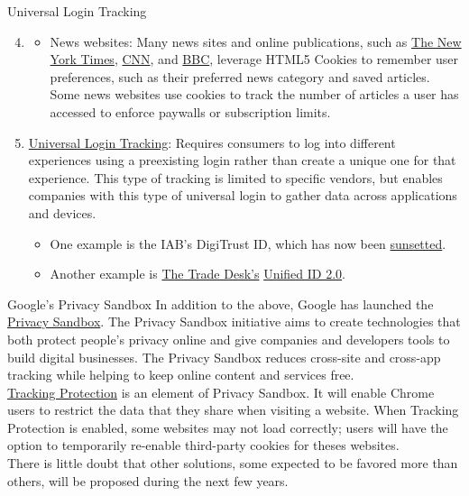 \documentclass[pdf]{beamer}
\theoremstyle{remark}
\theoremstyle{definition}
\begin{document}
\begin{frame}[t]{Universal Login Tracking}
\small
\begin{enumerate}
    \setcounter{enumi}{3}
\item []
\begin{itemize}
  \item News websites: Many news sites and online publications, such as \href{https://www.nytimes.com/}{The New York Times}, \href{https://www.cnn.com/}{CNN}, and \href{https://www.bbc.com/news}{BBC}, leverage HTML5 Cookies to remember user preferences, such as their preferred news category and saved articles. Some news websites use cookies to track the number of articles a user has accessed to enforce paywalls or subscription limits.
\end{itemize}
\item \underline{Universal Login Tracking}: Requires consumers to log into different experiences using a preexisting login rather than create a unique one for that experience. This type of tracking is limited to specific vendors, but enables companies with this type of universal login to gather data across applications and devices. \\
\vspace{1.5ex}
\begin{itemize}
  \item One example is the IAB's DigiTrust ID, which has now been \href{https://iabtechlab.com/blog/digitrust-the-final-chapter/}{sunsetted}. 
  \item Another example is \href{https://www.thetradedesk.com/us/about-us/industry-initiatives/unified-id-solution-2-0}{The Trade Desk's} \href{https://unifiedid.com/}{Unified ID 2.0}. 
\end{itemize}
\end{enumerate}
\end{frame}

\begin{frame}[t]{Google's Privacy Sandbox}
In addition to the above, Google has launched the \href{https://privacysandbox.com/}{Privacy Sandbox}.  The Privacy Sandbox initiative aims to create technologies that both protect people's privacy online and give companies and developers tools to build digital businesses. The Privacy Sandbox reduces cross-site and cross-app tracking while helping to keep online content and services free. \\
\vspace{1.5ex}
\href{https://blog.google/products/chrome/privacy-sandbox-tracking-protection/}{Tracking Protection} is an element of Privacy Sandbox.  It will enable Chrome users to restrict the data that they share when visiting a website. When Tracking Protection is enabled, some websites may not load correctly;  users will have the option to temporarily re-enable third-party cookies for theses websites. \\
\vspace{1.5ex}
There is little doubt that other solutions, some expected to be favored more than others, will be proposed during the next few years.
\end{frame}
\end{document}
